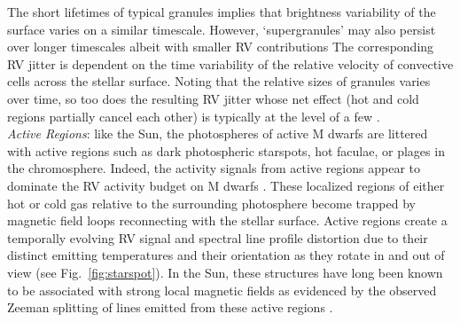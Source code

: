 The short lifetimes of typical granules
\citep[$\sim 10$ minutes;][]{hall08,gilliland11} implies that brightness variability of the
surface varies on a similar timescale. However, `supergranules' may also persist over longer
timescales albeit with smaller RV contributions \citep[$\lesssim 1$ \mps{;}][]{rincon17}
The corresponding RV jitter is dependent on the time variability of the relative velocity of 
convective cells across the stellar surface. 
Noting that the relative sizes of granules varies over time, so
too does the resulting RV jitter whose net effect (hot and cold regions partially
cancel each other) is typically at the level of a few \mps{} \citep{lindegren03}. \\

\emph{Active Regions}:
like the Sun, the photospheres of active M dwarfs are littered with active regions such
as dark photospheric starspots, hot faculae, or plages in the chromosphere. Indeed,
the activity signals from active regions appear to dominate the RV activity budget on M dwarfs
\citep{lindegren03}. These localized regions of either
hot or cold gas relative to the surrounding photosphere become trapped by magnetic field loops reconnecting
with the stellar surface. Active regions create a temporally evolving
RV signal and spectral line profile distortion due to their distinct emitting temperatures and their orientation
as they rotate in and out of view (see Fig.~\ref{fig:starspot}). In the Sun, these structures
have long been known to be associated with strong local magnetic fields as evidenced by the observed
Zeeman splitting of lines emitted from these active regions \citep{hale08}. \\

